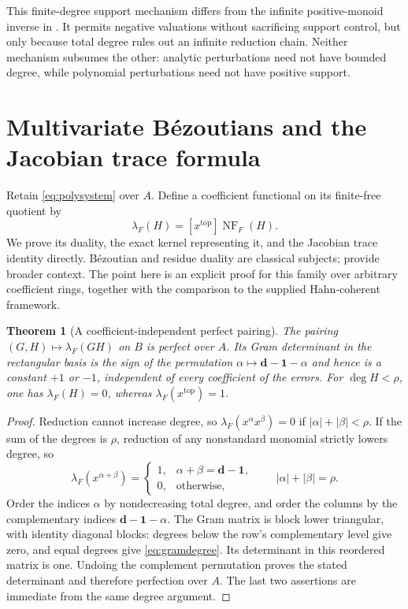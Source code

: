 \documentclass[11pt,letterpaper,oneside]{article}
\numberwithin{equation}{section}
\newtheorem{theorem}{Theorem}[section]
\theoremstyle{definition}
\theoremstyle{remark}\newtheorem{remark}[theorem]{Remark}
\newcommand{\NF}{\operatorname{NF}}\newcommand{\Tr}{\operatorname{Tr}}
\begin{document}
This finite-degree support mechanism differs from the infinite
positive-monoid inverse in \cite{SourceResearch}. It permits negative
valuations without sacrificing support control, but only because total
degree rules out an infinite reduction chain. Neither mechanism subsumes
the other: analytic perturbations need not have bounded degree, while
polynomial perturbations need not have positive support.

\section{Multivariate B\'ezoutians and the Jacobian trace formula}\label{sec:bezoutian}
Retain \eqref{eq:polysystem} over $A$. Define a coefficient functional
on its finite-free quotient by
\begin{equation}\label{eq:multilambda}
 \lambda_F(H)=[x^{\mathrm{top}}]\NF_F(H).
\end{equation}
We prove its duality, the exact kernel representing it, and the Jacobian
trace identity directly. B\'ezoutian and residue duality are classical
subjects; \cite{BCRS,BMP} provide broader context. The point here is an
explicit proof for this family over arbitrary coefficient rings, together
with the comparison to the supplied Hahn-coherent framework.

\begin{theorem}[A coefficient-independent perfect pairing]\label{thm:multiperfect}
The pairing $(G,H)\mapsto\lambda_F(GH)$ on $B$ is perfect over $A$.
Its Gram determinant in the rectangular basis is the sign of the
permutation $\alpha\mapsto\boldsymbol d-\boldsymbol1-\alpha$ and hence
is a constant $+1$ or $-1$, independent of every coefficient of the
errors. For $\deg H<\rho$, one has $\lambda_F(H)=0$, whereas
$\lambda_F(x^{\mathrm{top}})=1$.
\end{theorem}
\begin{proof}
Reduction cannot increase degree, so
$\lambda_F(x^\alpha x^\beta)=0$ if $|\alpha|+|\beta|<\rho$.
If the sum of the degrees is $\rho$, reduction of any nonstandard
monomial strictly lowers degree, so
\begin{equation}\label{eq:gramdegree}
 \lambda_F(x^{\alpha+\beta})=
 \begin{cases}1,&\alpha+\beta=\boldsymbol d-\boldsymbol1,\\
 0,&\text{otherwise},\end{cases}
 \qquad |\alpha|+|\beta|=\rho.
\end{equation}
Order the indices $\alpha$ by nondecreasing total degree, and order the
columns by the complementary indices
$\boldsymbol d-\boldsymbol1-\alpha$. The Gram matrix is block lower
triangular, with identity diagonal blocks: degrees below the row's
complementary level give zero, and equal degrees give
\eqref{eq:gramdegree}. Its determinant in this reordered matrix is one.
Undoing the complement permutation proves the stated determinant and
therefore perfection over $A$. The last two assertions are immediate
from the same degree argument.
\end{proof}
\end{document}
